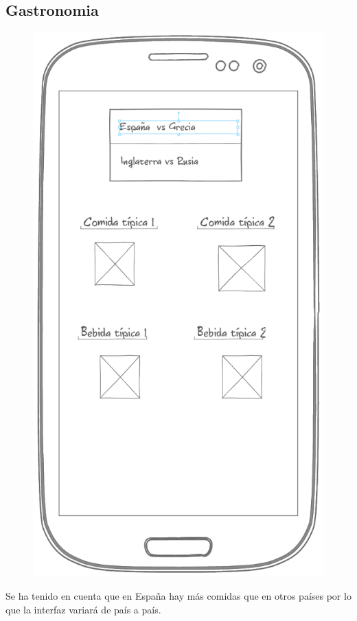 \documentclass[letterpaper,twocolumn,openany,nodeprecatedcode,dvipsnames,nomultitoc]{dndbook}
\begin{document}
\begin{justify}
\subsection{Gastronomia}
\begin{figure}[H]
\centering
\includegraphics[scale = 0.3]{Manual/img/Pantalla Gastronomia.png}
\end{figure}
Se ha tenido en cuenta que en España hay más comidas que en otros países por lo que la interfaz variará de país a país.
\vspace{5pt}

\end{justify}
\end{document}
